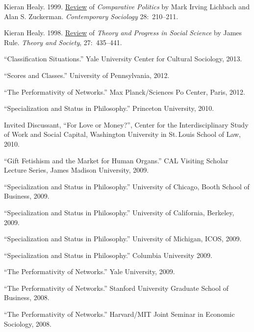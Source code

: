 \documentclass[11pt,article,oneside]{memoir}
\begin{document}
\ind  Kieran Healy. 1999. \href{http://links.jstor.org/sici?sici=0094-3061%28199903%2928%3A2%3C210%3ACPRCAS%3E2.0.CO%3B2-C}{Review} of \emph{Comparative Politics} by Mark Irving Lichbach and Alan S.
Zuckerman. \emph{Contemporary Sociology} 28:~210--211.


\ind  Kieran Healy. 1998. \href{http://www.kieranhealy.org/files/reviews/rule.pdf}{Review} of \emph{Theory and Progress in Social Science} by James Rule.  \emph{Theory
  and Society}, 27:~435--441.

 
 \bigskip

\medskip


\ind ``Classification Situations.'' Yale University Center for Cultural Sociology, 2013.
 
\ind ``Scores and Classes.'' University of Pennsylvania, 2012.

\ind ``The Performativity of Networks.'' Max Planck/Sciences Po Center, Paris, 2012. 
 
\ind ``Specialization and Status in Philosophy.'' Princeton University, 2010. 

\ind Invited Discussant, ``For Love or Money?'', Center for the Interdisciplinary Study of Work and Social Capital, Washington University in St.\,Louis School of Law, 2010. 

\ind ``Gift Fetishism and the Market for Human Organs.'' CAL Visiting Scholar Lecture Series, James Madison University, 2009. 

\ind ``Specialization and Status in Philosophy.'' University of Chicago, Booth School of Business, 2009. 

\ind ``Specialization and Status in Philosophy.'' University of California, Berkeley, 2009. 

\ind ``Specialization and Status in Philosophy.'' University of Michigan, ICOS, 2009. 

\ind ``Specialization and Status in Philosophy.'' Columbia University 2009. 

\ind ``The Performativity of Networks.'' Yale University, 2009. 

\ind ``The Performativity of Networks.'' Stanford University Graduate School of Business, 2008. 

\ind ``The Performativity of Networks.'' Harvard/MIT Joint Seminar in Economic Sociology, 2008. 
\end{document}
